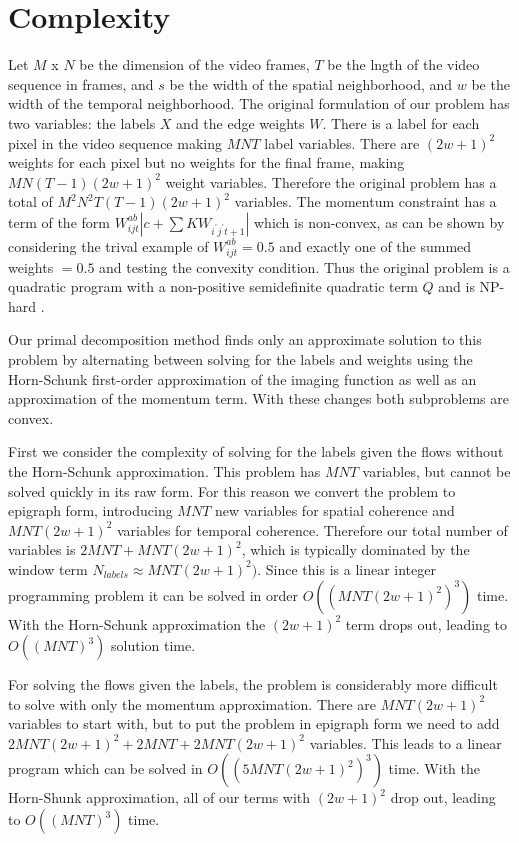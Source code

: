 \section{Complexity}

Let $M$ x $N$ be the dimension of the video frames, $T$ be the lngth of the video sequence in frames, and $s$ be the width of the spatial neighborhood, and $w$ be the width of the temporal neighborhood. The original formulation of our problem has two variables: the labels $X$ and the edge weights $W$. There is a label for each pixel in the video sequence making $M N T$ label variables. There are $(2 w+1)^2$ weights for each pixel but no weights for the final frame, making $M N (T-1) (2 w + 1)^2$ weight variables. Therefore the original problem has a total of $M^2 N^2 T (T-1) (2 w + 1)^2$ variables. The momentum constraint has a term of the form $W_{ijt}^{ab} |c + \sum K W_{i^{'} j^{'} t+1} |$ which is non-convex, as can be shown by considering the trival example of $W_{ijt}^{ab} = 0.5$ and exactly one of the summed weights $= 0.5$ and testing the convexity condition. Thus the original problem is a quadratic program with a non-positive semidefinite quadratic term $Q$ and is NP-hard \cite{qpishard}.

Our primal decomposition method finds only an approximate solution to this problem by alternating between solving for the labels and weights using the Horn-Schunk first-order approximation of the imaging function as well as an approximation of the momentum term. With these changes both subproblems are convex.

First we consider the complexity of solving for the labels given the flows without the Horn-Schunk approximation. This problem has $M N T$ variables, but cannot be solved quickly in its raw form. For this reason we convert the problem to epigraph form, introducing $M N T$ new variables for spatial coherence and $M N T (2 w + 1)^2$ variables for temporal coherence. Therefore our total number of variables is $2 M N T + M N T (2 w + 1)^2$, which is typically dominated by the window term $N_{labels} \approx M N T (2 w + 1)^2)$. Since this is a linear integer programming problem it can be solved in order $O((M N T (2 w + 1)^2)^3)$ time. With the Horn-Schunk approximation the $(2 w + 1)^2$ term drops out, leading to $O((M N T)^3)$ solution time.

For solving the flows given the labels, the problem is considerably more difficult to solve with only the momentum approximation. There are $M N T (2 w + 1)^2$ variables to start with, but to put the problem in epigraph form we need to add $2 M N T (2 w + 1)^2 + 2 M N T + 2 M N T (2 w + 1)^2$ variables. This leads to a linear program which can be solved in 
$O((5 M N T (2 w + 1)^2)^3)$ time. With the Horn-Shunk approximation, all of our terms with $(2 w + 1)^2$ drop out, leading to $O((M N T)^3)$ time.

